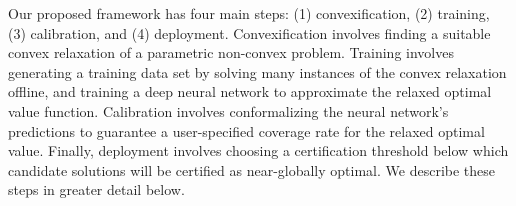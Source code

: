 \documentclass[10pt]{article} %
\theoremstyle{plain}
\theoremstyle{definition}
\theoremstyle{remark}
\begin{document}
Our proposed framework has four main steps: (1) convexification, (2) training, (3) calibration, and (4) deployment. Convexification involves finding a suitable convex relaxation of a parametric non-convex problem. Training involves generating a training data set by solving many instances of the convex relaxation offline, and training a deep neural network to approximate the relaxed optimal value function. Calibration involves conformalizing the neural network's predictions to guarantee a user-specified coverage rate for the relaxed optimal value. Finally, deployment involves choosing a certification threshold below which candidate solutions will be certified as near-globally optimal.
We describe these steps in greater detail below.\\

\end{document}
